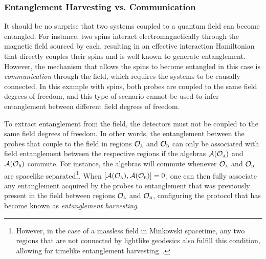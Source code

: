 \documentclass[letterpaper,12pt,titlepage,oneside,final]{book}
\newcommand{\tc}[1]{\textsc{#1}}
\begin{document}
    \subsubsection*{Entanglement Harvesting vs. Communication}

    It should be no surprise that two systems coupled to a quantum field can become entangled. For instance, two spins interact electromagnetically through the magnetic field sourced by each, resulting in an effective interaction Hamiltonian that directly couples their spins and is well known to generate entanglement. However, the mechanism that allows the spins to become entangled in this case is \textit{communication} through the field, which requires the systems to be causally connected. In this example with spins, both probes are coupled to the same field degrees of freedom, and this type of scenario cannot be used to infer entanglement between different field degrees of freedom.

    To extract entanglement from the field, the detectors must not be coupled to the same field degrees of freedom. In other words, the entanglement between the probes that couple to the field in regions $\mathcal{O}_\tc{a}$ and $\mathcal{O}_\tc{b}$ can only be associated with field entanglement between the respective regions if the algebras $\mathcal{A}(\mathcal{O}_\tc{a})$ and $\mathcal{A}(\mathcal{O}_\tc{b})$ commute. For instance, the algebras will commute whenever $\mathcal{O}_\tc{a}$ and $\mathcal{O}_\tc{b}$ are spacelike separated\footnote{However, in the case of a massless field in Minkowski spacetime, any two regions that are not connected by lightlike geodesics also fulfill this condition, allowing for timelike entanglement harvesting~\cite{pastfuture}.}. When $[\mathcal{A}(\mathcal{O}_\tc{a}),\mathcal{A}(\mathcal{O}_\tc{b})] = 0$, one can then fully associate any entanglement acquired by the probes to entanglement that was previously present in the field between regions $\mathcal{O}_\tc{a}$ and $\mathcal{O}_\tc{b}$, configuring the protocol that has become known as 
    \textit{entanglement harvesting}. 
\end{document}
